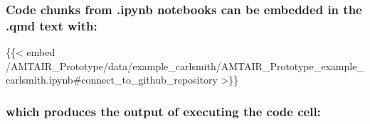 \documentclass[
  11pt,
  letterpaper,
]{book}
\newenvironment{Shaded}{\begin{snugshade}}{\end{snugshade}}
\newcommand{\NormalTok}[1]{\textcolor[rgb]{0.00,0.23,0.31}{#1}}
\begin{document}

\subsubsection*{Code chunks from .ipynb notebooks can be embedded in the
.qmd text
with:}\label{code-chunks-from-.ipynb-notebooks-can-be-embedded-in-the-.qmd-text-with}

\begin{Shaded}
\begin{Highlighting}[]
\NormalTok{\{\{\textless{} embed /AMTAIR\_Prototype/data/example\_carlsmith/AMTAIR\_Prototype\_example\_carlsmith.ipynb\#connect\_to\_github\_repository \textgreater{}\}\}}
\end{Highlighting}
\end{Shaded}

\subsubsection*{which produces the output of executing the code
cell:}\label{which-produces-the-output-of-executing-the-code-cell}
\end{document}
